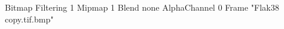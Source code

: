 {Bitmap
	{Filtering 1}
	{Mipmap 1}
	{Blend none}
	{AlphaChannel 0}
	{Frame "Flak38 copy.tif.bmp"}
}
